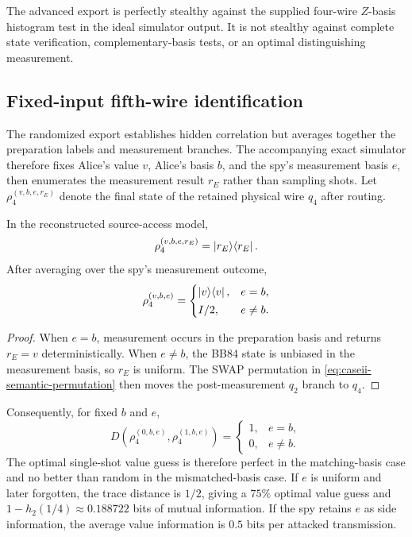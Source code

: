 \begin{rem}
The advanced export is perfectly stealthy against the supplied four-wire
$Z$-basis histogram test in the ideal simulator output. It is not stealthy
against complete state verification, complementary-basis tests, or an optimal
distinguishing measurement.
\end{rem}

\subsection{Fixed-input fifth-wire identification}

The randomized export establishes hidden correlation but averages together the
preparation labels and measurement branches. The accompanying exact simulator
therefore fixes Alice's value $v$, Alice's basis $b$, and the spy's measurement
basis $e$, then enumerates the measurement result $r_E$ rather than sampling
shots. Let $\rho_4^{(v,b,e,r_E)}$ denote the final state of the retained physical
wire $q_4$ after routing.

\begin{proposition}
In the reconstructed source-access model,
\begin{equation}
  \rho_4^{(v,b,e,r_E)}=\ket{r_E}\!\bra{r_E}.
  \label{eq:caseii-branch-retained-state}
\end{equation}
After averaging over the spy's measurement outcome,
\begin{equation}
  \rho_4^{(v,b,e)}=
  \begin{cases}
    \ket{v}\!\bra{v}, & e=b,\\[2pt]
    I/2, & e\neq b.
  \end{cases}
  \label{eq:caseii-fixed-input-theorem}
\end{equation}
\end{proposition}

\begin{proof}
When $e=b$, measurement occurs in the preparation basis and returns
$r_E=v$ deterministically. When $e\neq b$, the BB84 state is unbiased in the
measurement basis, so $r_E$ is uniform. The SWAP permutation in
\cref{eq:caseii-semantic-permutation} then moves the post-measurement $q_2$
branch to $q_4$.
\end{proof}

Consequently, for fixed $b$ and $e$,
\begin{equation}
D\!\left(\rho_4^{(0,b,e)},\rho_4^{(1,b,e)}\right)
=\begin{cases}1,&e=b,\\0,&e\neq b.\end{cases}
\label{eq:caseii-value-distinguishability}
\end{equation}
The optimal single-shot value guess is therefore perfect in the matching-basis
case and no better than random in the mismatched-basis case. If $e$ is uniform
and later forgotten, the trace distance is $1/2$, giving a $75\%$ optimal value
guess and $1-h_2(1/4)\approx0.188722$ bits of mutual information. If the spy
retains $e$ as side information, the average value information is $0.5$ bits per
attacked transmission.

